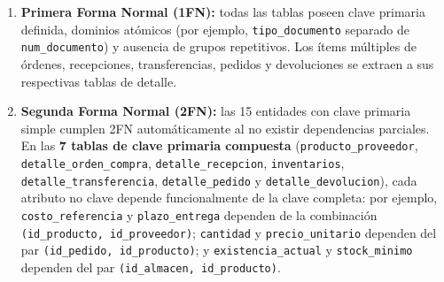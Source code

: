 \documentclass[11pt,oneside]{article}
\begin{document}
\begin{enumerate}[leftmargin=1.5em, itemsep=4pt]
  \item \textbf{Primera Forma Normal (1FN):} todas las tablas poseen clave
        primaria definida, dominios at\'omicos (por ejemplo, \texttt{tipo\_documento}
        separado de \texttt{num\_documento}) y ausencia de grupos repetitivos.
        Los \'items m\'ultiples de \'ordenes, recepciones, transferencias,
        pedidos y devoluciones se extraen a sus respectivas tablas de detalle.

  \item \textbf{Segunda Forma Normal (2FN):} las 15 entidades con clave primaria
        simple cumplen 2FN autom\'aticamente al no existir dependencias
        parciales. En las \textbf{7 tablas de clave primaria compuesta}
        (\texttt{producto\_\allowbreak proveedor},
        \texttt{detalle\_\allowbreak orden\_\allowbreak compra},
        \texttt{detalle\_\allowbreak recepcion}, \texttt{inventarios},
        \texttt{detalle\_\allowbreak transferencia},
        \texttt{detalle\_\allowbreak pedido} y
        \texttt{detalle\_\allowbreak devolucion}), cada atributo no clave depende
        funcionalmente de la clave completa: por ejemplo,
        \texttt{costo\_referencia} y \texttt{plazo\_entrega} dependen de la
        combinaci\'on \texttt{(id\_producto, id\_proveedor)};
        \texttt{cantidad} y \texttt{precio\_unitario} dependen del par
        \texttt{(id\_pedido, id\_producto)}; y \texttt{existencia\_\allowbreak actual} y
        \texttt{stock\_minimo} dependen del par
        \texttt{(id\_almacen, id\_producto)}.


\end{enumerate}
\end{document}
